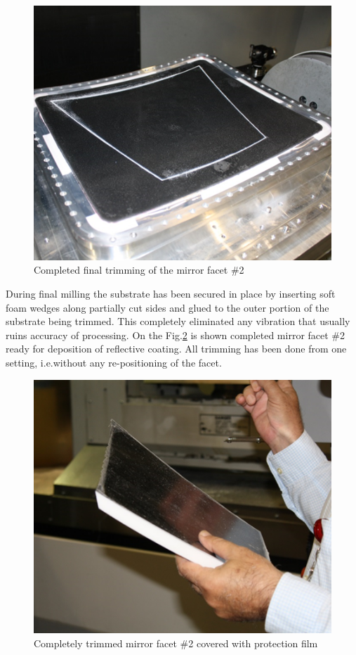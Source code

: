 \begin{figure}[h]
    \centering
    \includegraphics[width=1.0\linewidth]{Trimming_2}
    \caption{Completed final trimming of the mirror facet \#2}
    \label{fig:Trimming_2}
\end{figure}{}
During final milling the substrate has been secured in place by inserting soft foam wedges along partially cut sides and glued to the outer portion of the substrate being trimmed. This completely eliminated any vibration that usually ruins accuracy of processing. On the  Fig.\ref{fig:Trimmed} is shown completed mirror facet \#2 ready for deposition of reflective coating. All trimming has been done from one setting, i.e.without any re-positioning of the facet. 
\begin{figure}[h]
    \centering
    \includegraphics[width=1.0\linewidth]{Trimmed}
    \caption{Completely trimmed mirror facet \#2 covered with protection film }
    \label{fig:Trimmed}
\end{figure}{}
